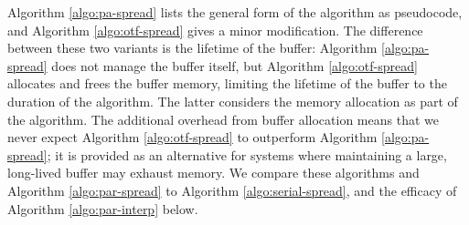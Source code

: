 Algorithm \ref{algo:pa-spread} lists the general form of the algorithm as pseudocode, and
Algorithm \ref{algo:otf-spread} gives a minor modification. The difference between these
two variants is the lifetime of the buffer: Algorithm \ref{algo:pa-spread} does not
manage the buffer itself, but Algorithm \ref{algo:otf-spread} allocates and frees the
buffer memory, limiting the lifetime of the buffer to the duration of the algorithm. The
latter considers the memory allocation as part of the algorithm. The additional overhead
from buffer allocation means that we never expect Algorithm \ref{algo:otf-spread} to
outperform Algorithm \ref{algo:pa-spread}; it is provided as an alternative for systems
where maintaining a large, long-lived buffer may exhaust memory. We compare these
algorithms and Algorithm \ref{algo:par-spread} to Algorithm \ref{algo:serial-spread}, and
the efficacy of Algorithm \ref{algo:par-interp} below.

